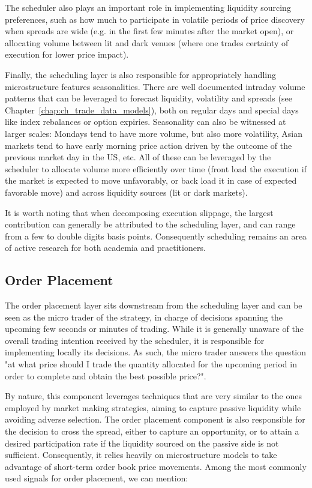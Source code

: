 The scheduler also plays an important role in  implementing liquidity sourcing preferences, such as how much to participate in volatile periods of price discovery when spreads are wide (e.g. in the first few minutes after the market open), or allocating volume between lit and dark venues (where one trades certainty of execution for lower price impact).

Finally, the scheduling layer is also responsible for appropriately handling microstructure features seasonalities. There are well documented intraday volume patterns that can be leveraged to forecast liquidity, volatility and spreads (see Chapter~\ref{chap:ch_trade_data_models}), both on regular days and special days like index rebalances or option expiries. Seasonality can also be witnessed at larger scales: Mondays tend to have more volume, but also more volatility, Asian markets tend to have early morning price action driven by the outcome of the previous market day in the US, etc. All of these can be leveraged by the scheduler to allocate volume more efficiently over time (front load the execution if the market is expected to move unfavorably, or back load it in case of expected favorable move) and across liquidity sources (lit or dark markets). 

It is worth noting that when decomposing execution slippage, the largest contribution can generally be attributed to the scheduling layer, and can range from a few to double digits basis points. Consequently scheduling remains an area of active research for both academia and practitioners.

\subsection{Order Placement}

The order placement layer sits downstream from the scheduling layer and can be seen as the micro trader of the strategy, in charge of decisions spanning the upcoming few seconds or minutes of trading. While it is generally unaware of the overall trading intention received by the scheduler, it is responsible for implementing locally its decisions. As such, the micro trader answers the question "at what price should I trade the quantity allocated for the upcoming period in order to complete and obtain the best possible price?". 

By nature, this component leverages techniques that are very similar to the ones employed by market making strategies, aiming to capture passive liquidity while avoiding adverse selection. The order placement component is also responsible for the decision to cross the spread, either to capture an opportunity, or to attain a desired participation rate if the liquidity sourced on the passive side is not sufficient. Consequently, it relies heavily on microstructure models to take advantage of short-term order book price movements. Among the most commonly used signals for order placement, we can mention:

